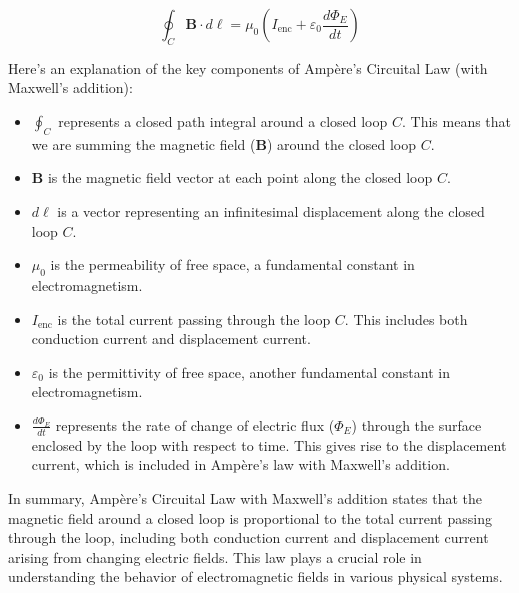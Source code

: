 \[
\oint_C \mathbf{B} \cdot d\boldsymbol{\ell} = \mu_0 \left( I_{\text{enc}} + \varepsilon_0 \frac{d\Phi_E}{dt} \right)
\]

Here's an explanation of the key components of Amp\`ere's Circuital Law (with Maxwell's addition):

\begin{itemize}
  \item $\oint_C$ represents a closed path integral around a closed loop $C$. This means that we are summing the magnetic field ($\mathbf{B}$) around the closed loop $C$.
  
  \item $\mathbf{B}$ is the magnetic field vector at each point along the closed loop $C$.
  
  \item $d\boldsymbol{\ell}$ is a vector representing an infinitesimal displacement along the closed loop $C$.
  
  \item $\mu_0$ is the permeability of free space, a fundamental constant in electromagnetism.
  
  \item $I_{\text{enc}}$ is the total current passing through the loop $C$. This includes both conduction current and displacement current.
  
  \item $\varepsilon_0$ is the permittivity of free space, another fundamental constant in electromagnetism.
  
  \item $\frac{d\Phi_E}{dt}$ represents the rate of change of electric flux ($\Phi_E$) through the surface enclosed by the loop with respect to time. This gives rise to the displacement current, which is included in Amp\`ere's law with Maxwell's addition.
\end{itemize}

In summary, Amp\`ere's Circuital Law with Maxwell's addition states that the magnetic field around a closed loop is proportional to the total current passing through the loop, including both conduction current and displacement current arising from changing electric fields. This law plays a crucial role in understanding the behavior of electromagnetic fields in various physical systems.

